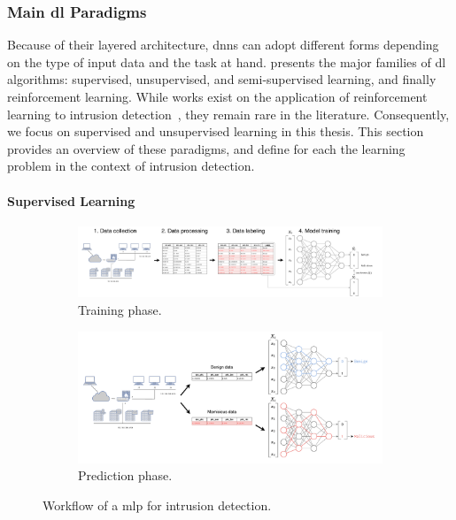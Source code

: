 \subsubsection{Main \Gls{dl} Paradigms}

Because of their layered architecture, \glspl{dnn} can adopt different forms depending on the type of input data and the task at hand.
 presents the major families of \gls{dl} algorithms: supervised, unsupervised, and semi-supervised learning, and finally reinforcement learning.
While works exist on the application of reinforcement learning to intrusion detection~\cite{he_ReinforcementLearningMeets_2024}, they remain rare in the literature.
Consequently, we focus on supervised and unsupervised learning in this thesis.
This section provides an overview of these paradigms, and define for each the learning problem in the context of intrusion detection.

\paragraph{Supervised Learning}

\begin{figure}
  \captionsetup{justification=justified,singlelinecheck=false}
  \centering
  \begin{subfigure}{\textwidth}
    \includegraphics[width=\textwidth]{figures/mlp-train.drawio.pdf}
    \caption{
      Training phase.
      \label{fig:bg.mlp.train}
    }
  \end{subfigure}
  \begin{subfigure}{\textwidth}
    \includegraphics[width=.75\textwidth,left]{figures/mlp-predict.drawio.pdf}
    \caption{
      Prediction phase.
      \label{fig:bg.mlp.predict}
    }
  \end{subfigure}
  \caption{
    Workflow of a \acrfull{mlp} for intrusion detection.
    \label{fig:bg.mlp}
  }
\end{figure}

